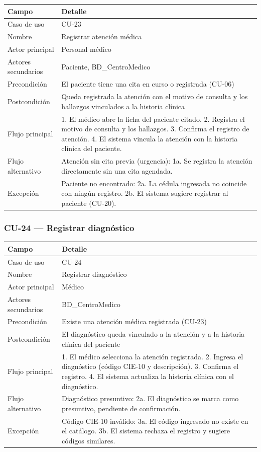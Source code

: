 \documentclass[11pt,a4paper]{article}
\begin{document}
	\begin{longtable}{p{} p{} }
		\toprule
		\textbf{Campo} & \textbf{Detalle} \\
		\midrule
		\endhead
		Caso de uso & CU-23 \\
		Nombre & Registrar atención médica \\
		Actor principal & Personal médico \\
		Actores secundarios & Paciente, BD\_CentroMedico \\
		Precondición & El paciente tiene una cita en curso o registrada (CU-06) \\
		Postcondición & Queda registrada la atención con el motivo de consulta y los hallazgos vinculados a la historia clínica \\
		Flujo principal & 1. El médico abre la ficha del paciente citado. 2. Registra el motivo de consulta y los hallazgos. 3. Confirma el registro de atención. 4. El sistema vincula la atención con la historia clínica del paciente. \\
		Flujo alternativo & Atención sin cita previa (urgencia): 1a. Se registra la atención directamente sin una cita agendada. \\
		Excepción & Paciente no encontrado: 2a. La cédula ingresada no coincide con ningún registro. 2b. El sistema sugiere registrar al paciente (CU-20). \\
		\bottomrule
	\end{longtable}
	
	\subsubsection{CU-24 --- Registrar diagnóstico}
	
	\begin{longtable}{p{} p{} }
		\toprule
		\textbf{Campo} & \textbf{Detalle} \\
		\midrule
		\endhead
		Caso de uso & CU-24 \\
		Nombre & Registrar diagnóstico \\
		Actor principal & Médico \\
		Actores secundarios & BD\_CentroMedico \\
		Precondición & Existe una atención médica registrada (CU-23) \\
		Postcondición & El diagnóstico queda vinculado a la atención y a la historia clínica del paciente \\
		Flujo principal & 1. El médico selecciona la atención registrada. 2. Ingresa el diagnóstico (código CIE-10 y descripción). 3. Confirma el registro. 4. El sistema actualiza la historia clínica con el diagnóstico. \\
		Flujo alternativo & Diagnóstico presuntivo: 2a. El diagnóstico se marca como presuntivo, pendiente de confirmación. \\
		Excepción & Código CIE-10 inválido: 3a. El código ingresado no existe en el catálogo. 3b. El sistema rechaza el registro y sugiere códigos similares. \\
		\bottomrule
	\end{longtable}
	
\end{document}
